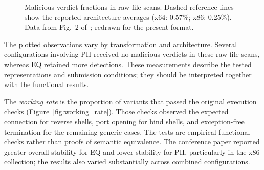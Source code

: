 \documentclass[runningheads]{llncs}
\providecommand{\Description}[1]{}
\begin{document}
\begin{figure}[tbp]
\Description{Malicious-verdict fractions in raw-file scans. Dashed reference lines show the reported architecture averages (x64: 0.57\%; x86: 0.25\%). Orange circles identify x64 and blue squares identify x86.}
\caption{Malicious-verdict fractions in raw-file scans. Dashed reference lines show the reported architecture averages (x64: 0.57\%; x86: 0.25\%). Data from Fig.~2 of~\cite{zone_secrypt_2026}; redrawn for the present format.}
\label{fig:all_payloads}
\end{figure}

The plotted observations vary by transformation and architecture. Several configurations involving PII received no malicious verdicts in these raw-file scans, whereas EQ retained more detections. These measurements describe the tested representations and submission conditions; they should be interpreted together with the functional results.

\label{par:working_rate}
The \emph{working rate} is the proportion of variants that passed the original execution checks (Figure~\ref{fig:working_rate}). Those checks observed the expected connection for reverse shells, port opening for bind shells, and exception-free termination for the remaining generic cases. The tests are empirical functional checks rather than proofs of semantic equivalence. The conference paper reported greater overall stability for EQ and lower stability for PII, particularly in the x86 collection; the results also varied substantially across combined configurations.
\end{document}
